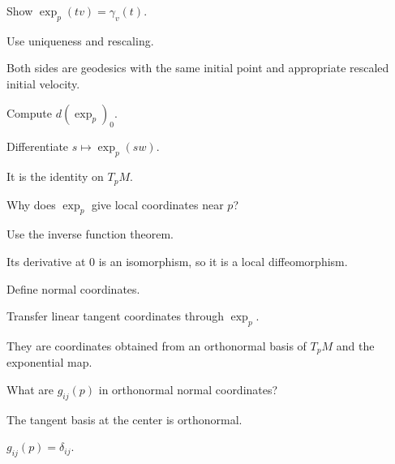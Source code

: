 \begin{exercise}\label{exr:vii23-08}
Show \(\exp_p(tv)=\gamma_v(t)\).
\end{exercise}
\begin{hint}
Use uniqueness and rescaling.
\end{hint}
\begin{solution}
Both sides are geodesics with the same initial point and appropriate rescaled initial velocity.
\end{solution}


\begin{exercise}\label{exr:vii23-09}
Compute \(d(\exp_p)_0\).
\end{exercise}
\begin{hint}
Differentiate \(s\mapsto\exp_p(sw)\).
\end{hint}
\begin{solution}
It is the identity on \(T_pM\).
\end{solution}


\begin{exercise}\label{exr:vii23-10}
Why does \(\exp_p\) give local coordinates near \(p\)?
\end{exercise}
\begin{hint}
Use the inverse function theorem.
\end{hint}
\begin{solution}
Its derivative at \(0\) is an isomorphism, so it is a local diffeomorphism.
\end{solution}


\begin{exercise}\label{exr:vii23-11}
Define normal coordinates.
\end{exercise}
\begin{hint}
Transfer linear tangent coordinates through \(\exp_p\).
\end{hint}
\begin{solution}
They are coordinates obtained from an orthonormal basis of \(T_pM\) and the exponential map.
\end{solution}


\begin{exercise}\label{exr:vii23-12}
What are \(g_{ij}(p)\) in orthonormal normal coordinates?
\end{exercise}
\begin{hint}
The tangent basis at the center is orthonormal.
\end{hint}
\begin{solution}
\(g_{ij}(p)=\delta_{ij}\).
\end{solution}


